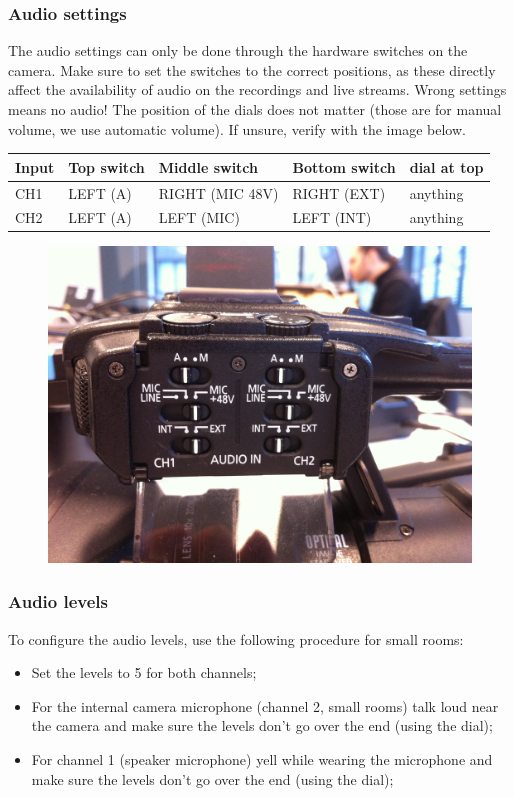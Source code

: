 \documentclass{article}
\begin{document}
\subsubsection{Audio settings}
The audio settings can only be done through the hardware switches on the camera.
Make sure to set the switches to the correct positions, as these directly affect the availability of audio on the recordings and live streams. Wrong settings means no audio!
The position of the dials does not matter (those are for manual volume, we use automatic volume).
If unsure, verify with the image below.

\begin{tabular}{| l || l | l | l | l |}
Input & Top switch & Middle switch & Bottom switch & dial at top \\ \hline
CH1 & LEFT (A) & RIGHT (MIC 48V) & RIGHT (EXT) & anything \\
CH2 & LEFT (A) & LEFT (MIC) & LEFT (INT) & anything \\
\end{tabular}

\begin{figure}[H]
  \centering
\includegraphics[width = 120mm]{canon_audio_settings.jpg}
\end{figure}

\subsubsection{Audio levels}

To configure the audio levels, use the following procedure for small rooms:
\begin{itemize}
  \item Set the levels to 5 for both channels;
  \item For the internal camera microphone (channel 2, small rooms) talk loud near the camera and make sure the levels don't go over the end (using the dial);
  \item For channel 1 (speaker microphone) yell while wearing the microphone and make sure the levels don't go over the end (using the dial);
\end{itemize}
\end{document}
